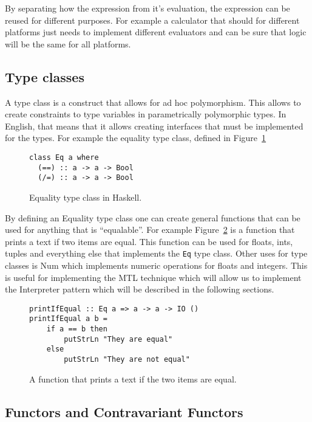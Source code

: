 By separating how the expression from it's evaluation, the expression can be
reused for different purposes. For example a calculator that should for
different platforms just needs to implement different evaluators and can be sure
that logic will be the same for all platforms.

\subsection{Type classes}\label{typeclass}

A type class is a construct that allows for ad hoc polymorphism. This allows to
create constraints to type variables in parametrically polymorphic types. In
English, that means that it allows creating interfaces that must be implemented
for the types. For example the equality type class, defined in
Figure~\ref{equalitytypeclass}

\begin{figure}[H]
    \begin{lstlisting}
class Eq a where
  (==) :: a -> a -> Bool
  (/=) :: a -> a -> Bool
    \end{lstlisting}
    \caption{Equality type class in Haskell.}
    \label{equalitytypeclass}
\end{figure}

By defining an Equality type class one can create general functions that can be
used for anything that is ``equalable''. For example Figure~\ref{printifequal}
is a function that prints a text if two items are equal. This function can be
used for floats, ints, tuples and everything else that implements the
\texttt{Eq} type class. Other uses for type classes is Num which implements
numeric operations for floats and integers. This is useful for implementing the
MTL technique which will allow us to implement the Interpreter pattern which
will be described in the following sections.

\begin{figure}[H]
    \begin{lstlisting}
printIfEqual :: Eq a => a -> a -> IO ()
printIfEqual a b =
	if a == b then
		putStrLn "They are equal"
	else
		putStrLn "They are not equal"
    \end{lstlisting}
    \caption{A function that prints a text if the two items are equal.}
    \label{printifequal}
\end{figure}

\subsection{Functors and Contravariant Functors}

